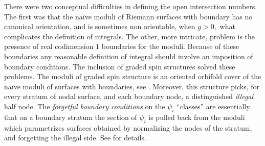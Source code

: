 \documentclass[11pt]{amsart}
\theoremstyle{definition}
\theoremstyle{remark}
\newcommand{\<}{\left<}
\renewcommand{\>}{\right>}
\numberwithin{equation}{section}
\begin{document}
There were two conceptual difficulties in defining the open intersection numbers. The first was that the na\"ive moduli of Riemann surfaces with %
boundary has no %
canonical orientation, and is sometimes %
non orientable, when %
$g>0,$ what complicates %
the definition of integrals. The other, more intricate, problem is the presence of real codimension $1$ boundaries for the moduli. Because of %
these boundaries any %
reasonable definition of integral should involve an imposition of boundary conditions. The inclusion of graded spin structures solved these problems. The moduli of graded spin %
structure is an %
oriented orbifold cover of the na\"ive moduli of surfaces %
with boundaries, see %
\cite[\S 5]{Tes15}. Moreover, this structure picks, for every stratum of %
nodal surface, and %
each boundary node, a distinguished \emph{illegal} half node. The \emph{forgetful boundary conditions} on the $\psi_i$ ``classes'' are essentially that on a boundary stratum the section of $\psi_i$ is pulled back from the moduli which parametrizes surfaces obtained by normalizing the nodes of the stratum, and forgetting the illegal side. See \cite[\S 2]{Tes15} for details. 
\end{document}
